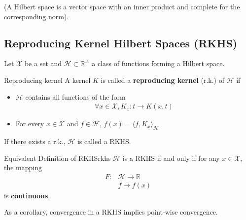 \documentclass{article}
\begin{document}
(A Hilbert space is a vector space with an inner product and complete for the 
corresponding norm).

\subsection{Reproducing Kernel Hilbert Spaces (RKHS)}

Let $\mathcal{X}$ be a set and $\mathcal{H} \subset \mathbb{R}^\mathcal{X}$ a 
class of functions forming a Hilbert space. 
\begin{Definition}{Reproducing kernel}{}
    A kernel $K$ is called a \textbf{reproducing kernel} (r.k.) of $\mathcal{H}$ 
    if 
    \begin{itemize}
        \item $\mathcal{H}$ contains all functions of the form 
        \begin{align*}
           \boxed{\forall x \in \mathcal{X}, K_x: t \rightarrow K(x, t)}
        \end{align*}
        \item For every $x \in \mathcal{X}$ and $f\in \mathcal{H}$, 
        $\boxed{f(x) = \langle f, K_x \rangle_\mathcal{H} }$
    \end{itemize}
\end{Definition}

If there exists a r.k., $\mathcal{H}$ is called a RKHS.

\begin{Theorem}{Equivalent Definition of RKHS}{rkhs}
    $\mathcal{H}$ is a RKHS if and only if for any $x\in\mathcal{X}$, the 
    mapping
    \begin{align*}
        F: & \mathcal{H}\rightarrow \mathbb{R}\\
        & f \mapsto f(x)
    \end{align*}
    is \textbf{continuous}.
\end{Theorem}

As a corollary, convergence in a RKHS implies point-wise convergence.
\end{document}
